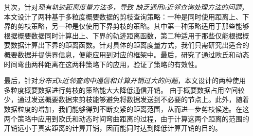其次，针对\textit{现有轨迹距离度量方法多，导致 缺乏通用$k$近邻查询处理方法的问题}，本文设计了两种基于多粒度概要数据的剪枝查询策略：一种是同时使用距离上、下界的剪枝策略，另一种是仅使用下界剪枝的策略。其中第一种策略适用于那些能够根据概要数据同时计算出上、下界的轨迹距离函数，第二种适用于那些仅能根据概要数据计算出下界的距离函数。针对具体的距离度量方式，我们只需研究出适合的概要数据并提供界信息，便能应用到对应的框架中。最后，研究了通过欧氏和动态时间弯曲两种距离在这两种策略下的应用，验证了策略的有效性。

最后，针对\textit{分布式$k$近邻查询中通信和计算开销过大的问题}，本文设计的两种使用多粒度概要数据进行剪枝的策略能大大降低通信开销。
由于概要数据占用空间较少，通过发送概要数据来剪枝能够避免将数据发送到不必要的节点上。此外，随着数据粒度的增加，我们能够得到不断变紧的距离范围，从而进一步剪枝候选。在这两个策略中应用到欧氏和动态时间弯曲距离的过程，由于计算这两个距离的范围的开销远小于真实距离的计算开销，因而能同时达到降低计算开销的目的。


	

